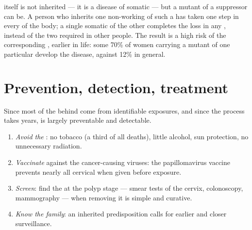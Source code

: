 \begin{proposition}\label{prop:g11:cancer:inherited}
 itself is not inherited --- it is a disease of somatic
 --- but a mutant  of a suppressor  can be. A person
who inherits one non-working  of such a  has taken one step
in every  of the body; a single somatic  of the other
 completes the loss in any , instead of the two required in
other people. The result is a high risk of the corresponding ,
earlier in life: some 70\% of women carrying a mutant  of one
particular   develop the disease, against 12\% in
general.
\end{proposition}
\admitted

\section{Prevention, detection, treatment}

\begin{method}\label{met:g11:cancer:prevention}
Since most of the  behind  come from identifiable
exposures, and since the process takes years,  is largely
preventable and detectable.
\begin{enumerate}
  \item \emph{Avoid the }: no tobacco (a third of all 
        deaths), little alcohol, sun protection, no unnecessary
        radiation.
  \item \emph{Vaccinate} against the cancer-causing viruses: the
        papillomavirus vaccine prevents nearly all cervical 
        when given before exposure.
  \item \emph{Screen}: find the  at the polyp stage --- smear
        tests of the cervix, colonoscopy, mammography --- when
        removing it is simple and curative.
  \item \emph{Know the family}: an inherited predisposition calls for
        earlier and closer surveillance.
\end{enumerate}
\end{method}

